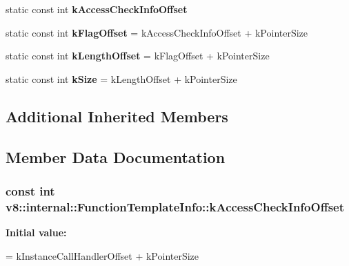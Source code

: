 \begin{DoxyCompactItemize}
\item 
static const int {\bfseries k\+Access\+Check\+Info\+Offset}
\item 
\hypertarget{classv8_1_1internal_1_1_function_template_info_a9287109e0a19b92dd8ddcbd3e5d8aa89}{}static const int {\bfseries k\+Flag\+Offset} = k\+Access\+Check\+Info\+Offset + k\+Pointer\+Size\label{classv8_1_1internal_1_1_function_template_info_a9287109e0a19b92dd8ddcbd3e5d8aa89}

\item 
\hypertarget{classv8_1_1internal_1_1_function_template_info_a3486aacd2eec65a1118faa477ea213ea}{}static const int {\bfseries k\+Length\+Offset} = k\+Flag\+Offset + k\+Pointer\+Size\label{classv8_1_1internal_1_1_function_template_info_a3486aacd2eec65a1118faa477ea213ea}

\item 
\hypertarget{classv8_1_1internal_1_1_function_template_info_a3b835a83d17c1b75f9d619017e7d985b}{}static const int {\bfseries k\+Size} = k\+Length\+Offset + k\+Pointer\+Size\label{classv8_1_1internal_1_1_function_template_info_a3b835a83d17c1b75f9d619017e7d985b}

\end{DoxyCompactItemize}
\subsection*{Additional Inherited Members}


\subsection{Member Data Documentation}
\hypertarget{classv8_1_1internal_1_1_function_template_info_aeb29db7f860af834c77262bcc6384d57}{}
\subsubsection[{k\+Access\+Check\+Info\+Offset}]{\setlength{\rightskip}{0pt plus 5cm}const int v8\+::internal\+::\+Function\+Template\+Info\+::k\+Access\+Check\+Info\+Offset\hspace{0.3cm}{\ttfamily [static]}}\label{classv8_1_1internal_1_1_function_template_info_aeb29db7f860af834c77262bcc6384d57}
{\bfseries Initial value\+:}
\begin{DoxyCode}
=
      kInstanceCallHandlerOffset + kPointerSize
\end{DoxyCode}
\hypertarget{classv8_1_1internal_1_1_function_template_info_a10153571866872320285f7f60686ce33}{}
